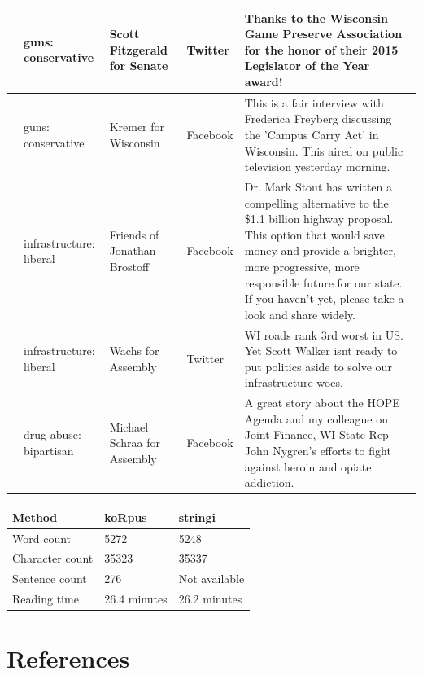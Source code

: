 \documentclass[12pt,]{article}
\begin{document}
\begin{longtable}[t]{>{\raggedright\arraybackslash}p{.65in}|>{\raggedright\arraybackslash}p{1in}|>{\raggedright\arraybackslash}p{1in}|>{\raggedright\arraybackslash}p{.7in}|>{\raggedright\arraybackslash}p{2.5in}}
\hline
8 & guns: conservative & Scott Fitzgerald for Senate & Twitter & Thanks to the Wisconsin Game Preserve Association for the honor of their 2015 Legislator of the Year award!\\
\hline
9 & guns: conservative & Kremer for Wisconsin & Facebook & This is a fair interview with Frederica Freyberg discussing the 'Campus Carry Act' in Wisconsin.  This aired on public television yesterday morning.\\
\hline
10 & infrastructure: liberal & Friends of Jonathan Brostoff & Facebook & Dr. Mark Stout has written a compelling alternative to the \$1.1 billion highway proposal. This option that would save money and provide a brighter, more progressive, more responsible future for our state. If you haven't yet, please take a look and share widely.\\
\hline
11 & infrastructure: liberal & Wachs for Assembly & Twitter & WI roads rank 3rd worst in US. Yet Scott Walker isnt ready to put politics aside to solve our infrastructure woes.\\
\hline
12 & drug abuse: bipartisan & Michael Schraa for Assembly & Facebook & A great story about the HOPE Agenda and my colleague on Joint Finance, WI State Rep John Nygren's efforts to fight against heroin and opiate addiction.\\
\hline
\end{longtable}

\begin{tabular}{l|l|l}
\hline
Method & koRpus & stringi\\
\hline
Word count & 5272 & 5248\\
\hline
Character count & 35323 & 35337\\
\hline
Sentence count & 276 & Not available\\
\hline
Reading time & 26.4 minutes & 26.2 minutes\\
\hline
\end{tabular}

\newpage

\hypertarget{references}{%
\section*{References}\label{references}}
\end{document}
